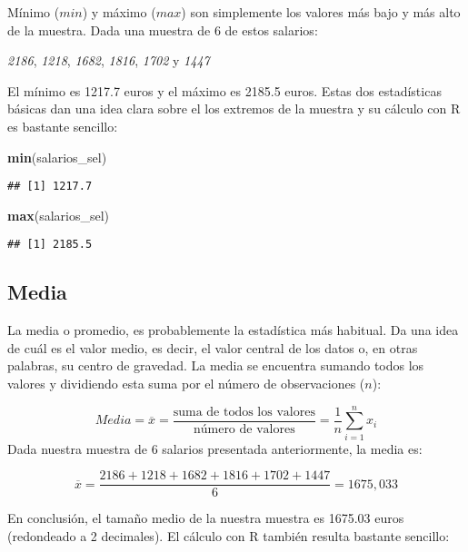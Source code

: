 \documentclass[
]{book}
\newenvironment{Shaded}{\begin{snugshade}}{\end{snugshade}}
\newcommand{\KeywordTok}[1]{\textcolor[rgb]{0.13,0.29,0.53}{\textbf{#1}}}
\newcommand{\NormalTok}[1]{#1}
\begin{document}
Mínimo (\(min\)) y máximo (\(max\)) son simplemente los valores más bajo y más alto de la muestra. Dada una muestra de 6 de estos salarios:

\emph{2186}, \emph{1218}, \emph{1682}, \emph{1816}, \emph{1702} y \emph{1447}

El mínimo es 1217.7 euros y el máximo es 2185.5 euros. Estas dos estadísticas básicas dan una idea clara sobre el los extremos de la muestra y su cálculo con R es bastante sencillo:

\begin{Shaded}
\begin{Highlighting}[]
\KeywordTok{min}\NormalTok{(salarios_sel)}
\end{Highlighting}
\end{Shaded}

\begin{verbatim}
## [1] 1217.7
\end{verbatim}

\begin{Shaded}
\begin{Highlighting}[]
\KeywordTok{max}\NormalTok{(salarios_sel)}
\end{Highlighting}
\end{Shaded}

\begin{verbatim}
## [1] 2185.5
\end{verbatim}

\hypertarget{media}{%
\subsection{Media}\label{media}}

La media o promedio, es probablemente la estadística más habitual. Da una idea de cuál es el valor medio, es decir, el valor central de los datos o, en otras palabras, su centro de gravedad. La media se encuentra sumando todos los valores y dividiendo esta suma por el número de observaciones (\(n\)):

\[Media =\overline{x}=\frac{\text{suma de todos los valores}}{\text{número de valores}} = \frac{1}{n}\sum^{n}_{i=1}x_i\]
Dada nuestra muestra de 6 salarios presentada anteriormente, la media es:

\[\overline{x} = \frac{2186 + 1218 + 1682 + 1816 + 1702 + 1447}{6}= 1675,033\]

En conclusión, el tamaño medio de la nuestra muestra es 1675.03 euros (redondeado a 2 decimales). El cálculo con R también resulta bastante sencillo:
\end{document}
